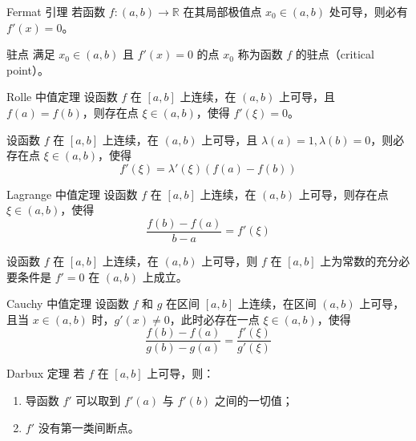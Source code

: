 \begin{theorem}{Fermat 引理}
    若函数 $f:(a,b)\to \mathbb{R}$ 在其局部极值点 $x_0 \in (a,b)$ 处可导，则必有 $f'(x) = 0$。
\end{theorem}

\begin{definition}{驻点}
    满足 $x_0 \in (a,b)$ 且 $f'(x) = 0$ 的点 $x_0$ 称为函数 $f$ 的驻点（critical point）。
\end{definition}

\begin{theorem}{Rolle 中值定理}
    设函数 $f$ 在 $[a,b]$ 上连续，在 $(a,b)$ 上可导，且 $f(a) = f(b)$，则存在点 $\xi \in (a,b)$，使得 $f'(\xi) = 0$。
\end{theorem}

\begin{lemma}
    设函数 $f$ 在 $[a,b]$ 上连续，在 $(a,b)$ 上可导，且 $\lambda(a) = 1, \lambda(b) = 0$，则必存在点 $\xi \in (a,b)$，使得
    \[f'(\xi) = \lambda'(\xi)(f(a) - f(b))\]
\end{lemma}

\begin{theorem}{Lagrange 中值定理}
    设函数 $f$ 在 $[a,b]$ 上连续，在 $(a,b)$ 上可导，则存在点 $\xi \in (a,b)$，使得
    \[\frac{f(b) - f(a)}{b - a} = f'(\xi)\]
\end{theorem}

\begin{corollary}
    设函数 $f$ 在 $[a,b]$ 上连续，在 $(a,b)$ 上可导，则 $f$ 在 $[a,b]$ 上为常数的充分必要条件是 $f' = 0$ 在 $(a,b)$ 上成立。
\end{corollary}

\begin{theorem}{Cauchy 中值定理}
    设函数 $f$ 和 $g$ 在区间 $[a,b]$ 上连续，在区间 $(a,b)$ 上可导，且当 $x \in (a,b)$ 时，$g'(x) \ne 0$，此时必存在一点 $\xi \in (a,b)$，使得
    \[\frac{f(b) - f(a)}{g(b) - g(a)} = \frac{f'(\xi)}{g'(\xi)}\]
\end{theorem}

\begin{theorem}{Darbux 定理}
    若 $f$ 在 $[a,b]$ 上可导，则：
    \begin{enumerate}
        \item 导函数 $f'$ 可以取到 $f'(a)$ 与 $f'(b)$ 之间的一切值；
        \item $f'$ 没有第一类间断点。
    \end{enumerate}
\end{theorem}




